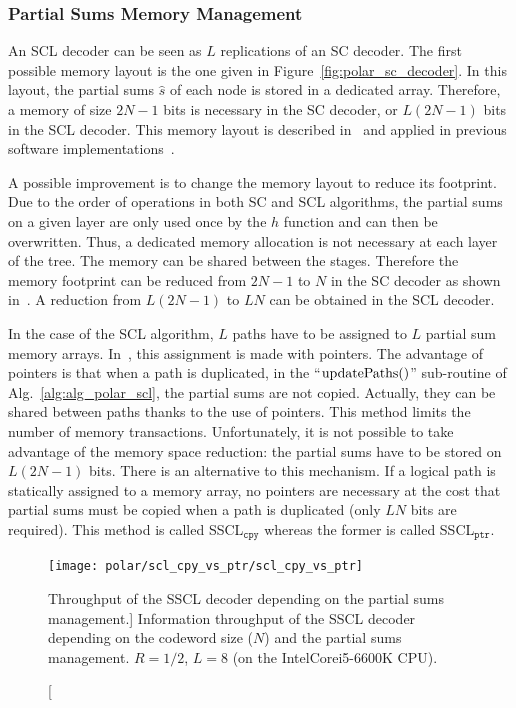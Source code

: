 \subsubsection{Partial Sums Memory Management}

An SCL decoder can be seen as $L$ replications of an SC decoder. The first
possible memory layout is the one given in Figure~\ref{fig:polar_sc_decoder}. In
this layout, the partial sums $\hat{s}$ of each node is stored in a dedicated
array. Therefore, a memory of size $2N-1$ bits is necessary in the SC decoder,
or $L(2N -1)$ bits in the SCL decoder. This memory layout is described
in~\cite{Tal2011} and applied in previous software
implementations~\cite{Sarkis2014b,Sarkis2016,Shen2016}.

A possible improvement is to change the memory layout to reduce its footprint.
Due to the order of operations in both SC and SCL algorithms, the partial sums
on a given layer are only used once by the $h$ function and can then be
overwritten. Thus, a dedicated memory allocation is not necessary at each layer
of the tree. The memory can be shared between the stages. Therefore the memory
footprint can be reduced from $2N-1$ to $N$ in the SC decoder as shown
in~\cite{Leroux2013}. A reduction from $L(2N -1)$ to $LN$ can be obtained in the
SCL decoder.

In the case of the SCL algorithm, $L$ paths have to be assigned to $L$ partial
sum memory arrays. In~\cite{Tal2011}, this assignment is made with pointers. The
advantage of pointers is that when a path is duplicated, in the
``$\operatorname*{updatePaths}()$'' sub-routine of Alg.~\ref{alg:alg_polar_scl}, the partial
sums are not copied. Actually, they can be shared between paths thanks to the
use of pointers. This method limits the number of memory transactions.
Unfortunately, it is not possible to take advantage of the memory space
reduction: the partial sums have to be stored on $L(2N -1)$ bits. There is an
alternative to this mechanism. If a logical path is statically assigned to a
memory array, no pointers are necessary at the cost that partial sums must be
copied when a path is duplicated (only $LN$ bits are required). This method is
called SSCL$_{\texttt{cpy}}$ whereas the former is called SSCL$_{\texttt{ptr}}$.

\begin{figure}[htp]
  \centering
  \texttt{[image: polar/scl\_cpy\_vs\_ptr/scl\_cpy\_vs\_ptr]}
  \caption
    [Throughput of the SSCL decoder depending on the partial sums management.]
    {Information throughput of the SSCL decoder depending on the codeword
    size ($N$) and the partial sums management. $R = 1 / 2$, $L = 8$ (on the
    Intel\R Core\TM i5-6600K CPU).}
  \label{plot:polar_scl_cpy_vs_ptr}
\end{figure}

